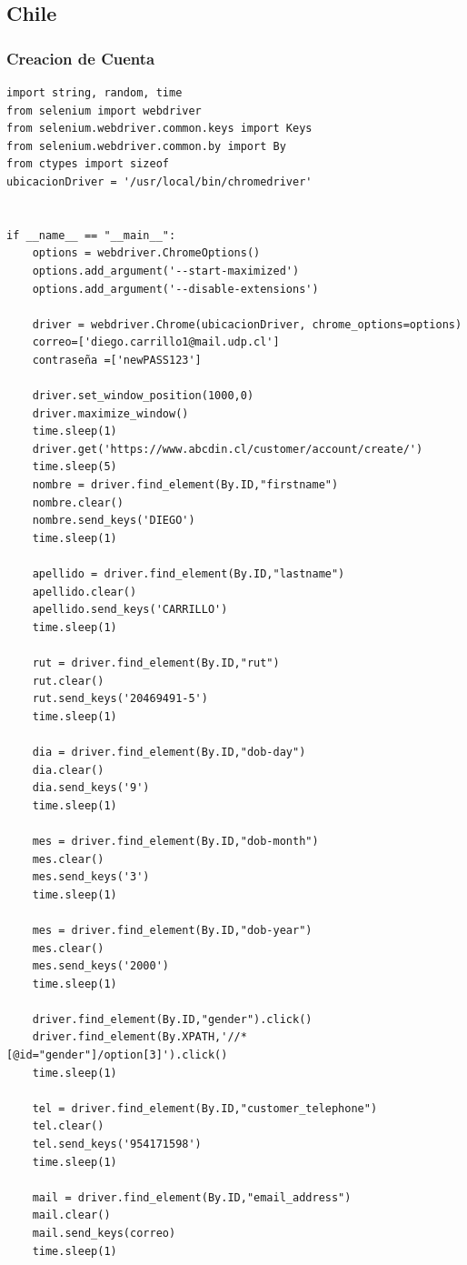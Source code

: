 \documentclass[]{article}
\begin{document}
\subsection{Chile}
\subsubsection{Creacion de Cuenta}
    \begin{lstlisting}[lenguaje=py]
        import string, random, time
from selenium import webdriver
from selenium.webdriver.common.keys import Keys
from selenium.webdriver.common.by import By
from ctypes import sizeof
ubicacionDriver = '/usr/local/bin/chromedriver'


if __name__ == "__main__":
    options = webdriver.ChromeOptions()
    options.add_argument('--start-maximized')
    options.add_argument('--disable-extensions')

    driver = webdriver.Chrome(ubicacionDriver, chrome_options=options)
    correo=['diego.carrillo1@mail.udp.cl']
    contraseña =['newPASS123']

    driver.set_window_position(1000,0)
    driver.maximize_window()
    time.sleep(1)
    driver.get('https://www.abcdin.cl/customer/account/create/')
    time.sleep(5)
    nombre = driver.find_element(By.ID,"firstname")
    nombre.clear()
    nombre.send_keys('DIEGO')
    time.sleep(1)
    
    apellido = driver.find_element(By.ID,"lastname")
    apellido.clear()
    apellido.send_keys('CARRILLO')
    time.sleep(1)

    rut = driver.find_element(By.ID,"rut")
    rut.clear()
    rut.send_keys('20469491-5')
    time.sleep(1)

    dia = driver.find_element(By.ID,"dob-day")
    dia.clear()
    dia.send_keys('9')
    time.sleep(1)

    mes = driver.find_element(By.ID,"dob-month")
    mes.clear()
    mes.send_keys('3')
    time.sleep(1)

    mes = driver.find_element(By.ID,"dob-year")
    mes.clear()
    mes.send_keys('2000')
    time.sleep(1)

    driver.find_element(By.ID,"gender").click()
    driver.find_element(By.XPATH,'//*[@id="gender"]/option[3]').click()
    time.sleep(1)

    tel = driver.find_element(By.ID,"customer_telephone")
    tel.clear()
    tel.send_keys('954171598')
    time.sleep(1)

    mail = driver.find_element(By.ID,"email_address")
    mail.clear()
    mail.send_keys(correo)
    time.sleep(1)


\end{lstlisting}
\end{document}
